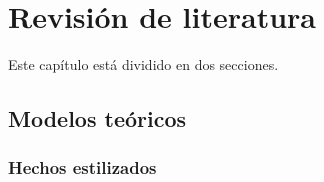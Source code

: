 \chapter{Revisión de literatura}

\noindent Este capítulo está dividido en dos secciones.  

\newpage

\section{Modelos teóricos}

\subsection{Hechos estilizados}
